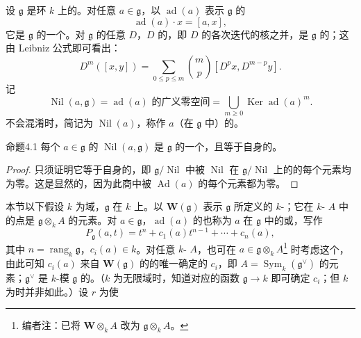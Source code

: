 设 $\mathfrak g$ 是环 $k$ 上的。对任意 $a\in\mathfrak g$，以 $\operatorname{ad}(a)$ 表示 $\mathfrak g$ 的
\[\operatorname{ad}(a)\cdot x=[a,x],\]
它是 $\mathfrak g$ 的一个。对 $\mathfrak g$ 的任意 $D$，$D$ 的，即 $D$ 的各次迭代的核之并，是 $\mathfrak g$ 的；这由 Leibniz 公式即可看出：
\[D^m([x,y])=\sum_{0\leq p\leq m}\binom mp[D^px,D^{m-p}y].\]
记
\[\operatorname{Nil}(a,\mathfrak g)=\operatorname{ad}(a)\text{ 的广义零空间}=\bigcup_{m\geq0}\operatorname{Ker}\operatorname{ad}(a)^m.\]
不会混淆时，简记为 $\operatorname{Nil}(a)$，称作 $a$（在 $\mathfrak g$ 中）的。
\begin{SGAresult}{命题}{4.1}
每个 $a\in\mathfrak g$ 的 $\operatorname{Nil}(a,\mathfrak g)$ 是 $\mathfrak g$ 的一个，且等于自身的。
\end{SGAresult}
\begin{proof}
只须证明它等于自身的，即 $\mathfrak g/\operatorname{Nil}$ 中被 $\operatorname{Nil}$ 在 $\mathfrak g/\operatorname{Nil}$ 上的的每个元素均为零。这是显然的，因为此商中被 $\operatorname{Ad}(a)$ 的每个元素都为零。
\end{proof}
本节以下假设 $k$ 为域，$\mathfrak g$ 在 $k$ 上。以 $\mathbf W(\mathfrak g)$ 表示 $\mathfrak g$ 所定义的 $k$-；它在 $k$- $A$ 中的点是 $\mathfrak g\otimes_k A$ 的元素。对 $a\in\mathfrak g$，$\operatorname{ad}(a)$ 的也称为 $a$ 在 $\mathfrak g$ 中的或，写作
\[P_{\mathfrak g}(a,t)=t^n+c_1(a)t^{n-1}+\cdots+c_n(a),\]
其中 $n=\operatorname{rang}_k\mathfrak g$，$c_i(a)\in k$。对任意 $k$- $A$，也可在 $a\in\mathfrak g\otimes_k A$\footnote{编者注：已将 $\mathbf W\otimes_k A$ 改为 $\mathfrak g\otimes_k A$。} 时考虑这个，由此可知 $c_i(a)$ 来自 $\mathbf W(\mathfrak g)$ 的的唯一确定的 $c_i$，即 $A=\operatorname{Sym}_k(\mathfrak g^\vee)$ 的元素；$\mathfrak g^\vee$ 是 $k$-模 $\mathfrak g$ 的。（$k$ 为无限域时，知道对应的函数 $\mathfrak g\to k$ 即可确定 $c_i$；但 $k$ 为时并非如此。）设 $r$ 为使
